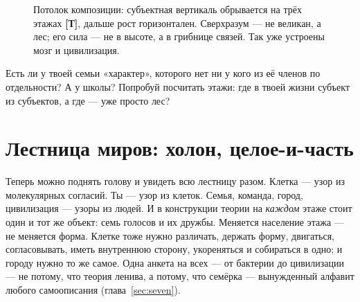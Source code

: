 \documentclass[11pt,letterpaper]{article}
\newcommand{\stT}{\textbf{[Т]}\xspace}
\begin{document}
\begin{figure}[H]
\centering
{}
\caption{Потолок композиции: субъектная вертикаль обрывается на трёх
этажах \stT, дальше рост горизонтален. Сверхразум --- не великан, а
лес; его сила --- не в высоте, а в грибнице связей. Так уже устроены
мозг и цивилизация.}
\label{fig:forest}
\end{figure}

\begin{askbox}
Есть ли у твоей семьи «характер», которого нет ни у кого из её
членов по отдельности? А у школы? Попробуй посчитать этажи: где в
твоей жизни субъект из субъектов, а где --- уже просто лес?
\end{askbox}

\section{Лестница миров: холон, целое-и-часть}
\label{sec:worlds}

Теперь можно поднять голову и увидеть всю лестницу разом. Клетка ---
узор из молекулярных согласий. Ты --- узор из клеток. Семья, команда,
город, цивилизация --- узоры из людей. И в конструкции теории на
\emph{каждом} этаже стоит один и тот же объект: семь голосов и их
дружбы. Меняется население этажа --- не меняется форма. Клетке тоже
нужно различать, держать форму, двигаться, согласовывать, иметь
внутреннюю сторону, укореняться и собираться в одно; и городу нужно
то же самое. Одна анкета на всех --- от бактерии до цивилизации ---
не потому, что теория ленива, а потому, что семёрка --- вынужденный
алфавит любого самоописания (глава~\ref{sec:seven}).
\end{document}
